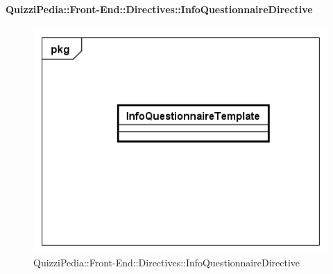 		\paragraph{QuizziPedia::Front-End::Directives::InfoQuestionnaireDirective}
		
		\label{QuizziPedia::Front-End::Directives::InfoQuestionnaireDirective}
		
		\begin{figure}[ht]
			\centering
			\includegraphics[scale=0.5,keepaspectratio]{UML/Classi/Front-End/QuizziPedia_Front-end_Templates_InfoQuestionnaireTemplate.png}
			\caption{QuizziPedia::Front-End::Directives::InfoQuestionnaireDirective}
		\end{figure} \FloatBarrier
		
